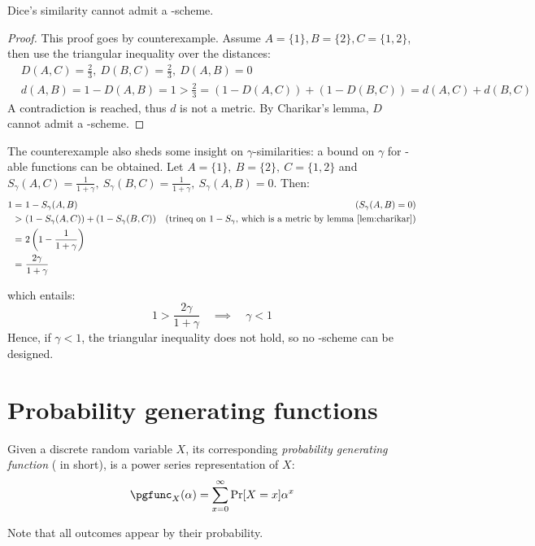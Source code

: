 \begin{corollary}
    Dice's similarity cannot admit a \lsh-scheme.
\end{corollary}

\begin{proof}
    This proof goes by counterexample. Assume $A = \{1\}, B = \{2\}, C = \{1, 2\}$, then use the triangular inequality over the distances:
    \begin{align*}
        & D(A, C) = \frac{2}{3},\ D(B, C) = \frac{2}{3},\ D(A, B) = 0 \\
        & d(A, B) = 1 - D(A, B) = 1 > \frac{2}{3} = (1 - D(A, C)) + (1 - D(B, C)) = d(A, C) + d(B, C)
    \end{align*}
    A contradiction is reached, thus $d$ is not a metric. By Charikar's lemma, $D$ cannot admit a \lsh-scheme.
\end{proof}

The counterexample also sheds some insight on $\gamma$-similarities: a bound on $\gamma$ for \lsh-able functions can be obtained. Let $A = \{1\},\ B = \{2\},\ C = \{1, 2\}$ and $S_\gamma(A, C) = \frac{1}{1 + \gamma},\ S_\gamma(B, C) = \frac{1}{1 + \gamma},\ S_\gamma(A, B) = 0$. Then:
\begin{align*}
    1 =&\ 1 - S_\gamma(A, B) 							& (S_\gamma(A, B) = 0) \\
      >&\ (1 - S_\gamma(A, C)) + (1 - S_\gamma(B, C)) 	& \text{(trineq on $1 - S_\gamma$, which is a metric by lemma \ref{lem:charikar})} \\
      =&\ 2 \left( 1 - \frac{1}{1 + \gamma} \right)		& \\
      =&\ \frac{2\gamma}{1 + \gamma} 					&
\end{align*}

which entails:
\[
    1 > \frac{2\gamma}{1 + \gamma} \quad \implies \quad \gamma < 1
\]
Hence, if $\gamma < 1$, the triangular inequality does not hold, so no \lsh-scheme can be designed.

    
\section{Probability generating functions}

\begin{definition}

    Given a discrete random variable $X$, its corresponding \emph{probability generating function} (\pgf{} in short), is a power series representation of $X$:
    \[
        \pgfunc_X(\alpha) = \sum_{x = 0}^{\infty} \Pr[X = x] \alpha^x
    \]

    Note that all outcomes appear by their probability.
\end{definition}

